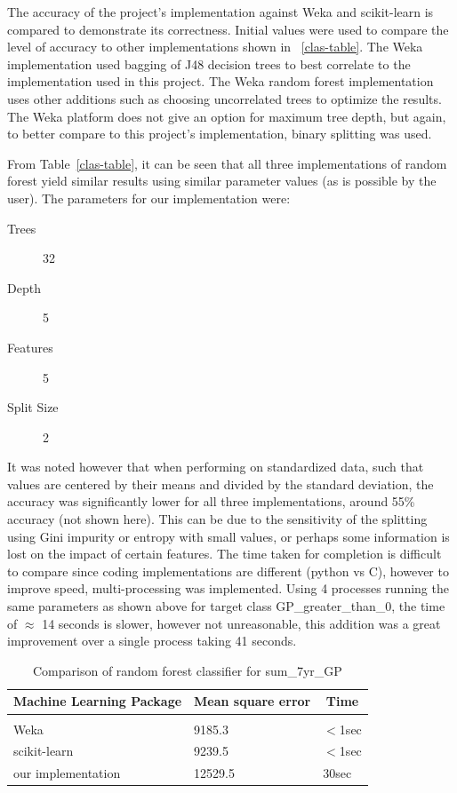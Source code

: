 \documentclass{article} %
\begin{document}
The accuracy of the project’s implementation against Weka and scikit-learn is compared to demonstrate
its correctness.  Initial values were used to compare the level of accuracy to other implementations shown in ~\ref{clas-table}. The Weka implementation used bagging of J48 decision trees to best correlate to the implementation used in this project. The Weka random forest implementation uses other additions such as choosing uncorrelated trees to optimize the results. The Weka platform does not give an option for maximum tree depth, but again, to better compare to this project's implementation, binary splitting was used.

From Table~\ref{clas-table}, it can be seen that all three implementations of random forest yield similar results using similar parameter values (as is possible by the user). The parameters for our implementation were:
\begin{description}
\item [Trees] 32
\item [Depth] 5
\item [Features] 5
\item [Split Size] 2
\end{description}

It was noted however that when performing on standardized data, such that values are centered by their means and divided by the standard deviation, the accuracy was significantly lower for all three implementations, around 55\% accuracy (not shown here). This can be due to the sensitivity of the splitting using Gini impurity or entropy with small values, or perhaps some information is lost on the impact of certain features. The time taken for completion is difficult to compare since coding implementations are different (python vs C), however to improve speed, multi-processing was implemented. Using 4 processes running the same parameters as shown above for target class GP\_greater\_than\_0, the time of $\approx$ 14 seconds is slower, however not unreasonable, this addition was a great improvement over a single process taking 41 seconds.

\begin{table}[h]
\caption{Comparison of random forest classifier for sum\_7yr\_GP}
\label{reg-table}
\begin{center}
\begin{tabular}{lll}
\multicolumn{1}{c}{\bf Machine Learning Package} &\multicolumn{1}{c}{\bf Mean square error} &\multicolumn{1}{c}{\bf Time}
\\ \hline \\
Weka         &9185.3	&$<$1sec \\
scikit-learn             &9239.5	&$<$1sec \\
our implementation             &12529.5	&30sec \\
\end{tabular}
\end{center}
\end{table}
\end{document}
